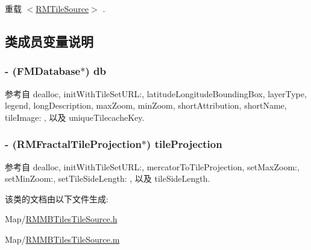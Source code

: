 重载 \hyperlink{protocol_r_m_tile_source-p_a1838a34e9341efe7c76252e131824261}{$<$\-R\-M\-Tile\-Source$>$} .



\subsection{类成员变量说明}
\hypertarget{interface_r_m_m_b_tiles_tile_source_ae3da662873347f8608f9d6dc3b450771}{
\subsubsection[{db}]{\setlength{\rightskip}{0pt plus 5cm}-\/ (F\-M\-Database$\ast$) db\hspace{0.3cm}{\ttfamily [protected]}}}\label{interface_r_m_m_b_tiles_tile_source_ae3da662873347f8608f9d6dc3b450771}


参考自 dealloc, init\-With\-Tile\-Set\-U\-R\-L\-:, latitude\-Longitude\-Bounding\-Box, layer\-Type, legend, long\-Description, max\-Zoom, min\-Zoom, short\-Attribution, short\-Name, tile\-Image\-: , 以及 unique\-Tilecache\-Key.

\hypertarget{interface_r_m_m_b_tiles_tile_source_a3daa7aaad56a256e9feef893221306be}{
\subsubsection[{tile\-Projection}]{\setlength{\rightskip}{0pt plus 5cm}-\/ ({\bf R\-M\-Fractal\-Tile\-Projection}$\ast$) tile\-Projection\hspace{0.3cm}{\ttfamily [protected]}}}\label{interface_r_m_m_b_tiles_tile_source_a3daa7aaad56a256e9feef893221306be}


参考自 dealloc, init\-With\-Tile\-Set\-U\-R\-L\-:, mercator\-To\-Tile\-Projection, set\-Max\-Zoom\-:, set\-Min\-Zoom\-:, set\-Tile\-Side\-Length\-: , 以及 tile\-Side\-Length.



该类的文档由以下文件生成\-:\begin{DoxyCompactItemize}
\item 
Map/\hyperlink{_r_m_m_b_tiles_tile_source_8h}{R\-M\-M\-B\-Tiles\-Tile\-Source.\-h}\item 
Map/\hyperlink{_r_m_m_b_tiles_tile_source_8m}{R\-M\-M\-B\-Tiles\-Tile\-Source.\-m}\end{DoxyCompactItemize}
